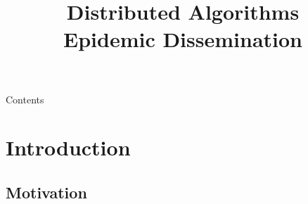 
\title[DS - Epidemic Dissemination]{\textbf{Distributed Algorithms}\\Epidemic Dissemination}



\newcommand{\Value}{\mathit{value}}
\newcommand{\Time}{\fontvar{time}}
\newcommand{\Now}{\fontproc{now}}
\newcommand{\Random}{\fontproc{random}}
\newcommand{\Update}{\textsc{update}\xspace}
\newcommand{\Push}{\textsc{push}\xspace}
\newcommand{\Pull}{\textsc{pull}\xspace}
\newcommand{\ReplyPull}{\textsc{reply}\xspace}
\newcommand{\PushPull}{\textsc{pushpull}\xspace}
\newcommand{\ReplyPushPull}{\textsc{reply}\xspace}


\begin{frame}
\titlepage
\end{frame}

\begin{frame}[shrink]{Contents}
\tableofcontents
\end{frame}

\section{Introduction}

\subsection{Motivation}

